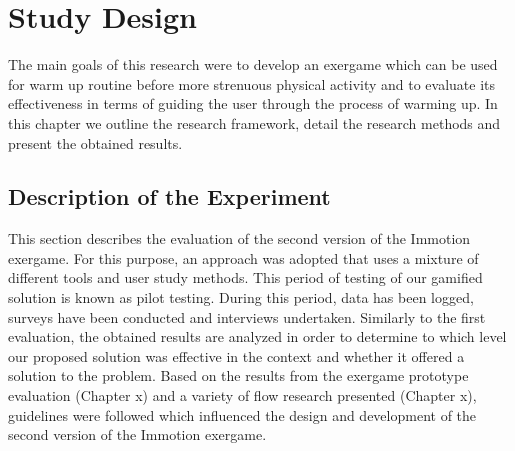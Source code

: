 \chapter{Study Design}\label{chapter:studydesign}
The main goals of this research were to develop an exergame which can be used for warm up routine before more strenuous physical activity and to evaluate its effectiveness in terms of guiding the user through the process of warming up. In this chapter we outline the research framework, detail the research methods and present the obtained results.
\section{Description of the Experiment}
This section describes the evaluation of the second version of the Immotion exergame. For this purpose, an approach was adopted that uses a mixture of different tools and user study methods. This period of testing of our gamified solution is known as pilot testing. During this period, data has been logged, surveys have been conducted and interviews undertaken. Similarly to the first evaluation, the obtained results are analyzed in order to determine to which level our proposed solution was effective in the context and whether it offered a solution to the problem. Based on the results from the exergame prototype evaluation (Chapter x) and a variety of flow research presented (Chapter x), guidelines were followed which influenced the design and development of the second version of the Immotion exergame. 

